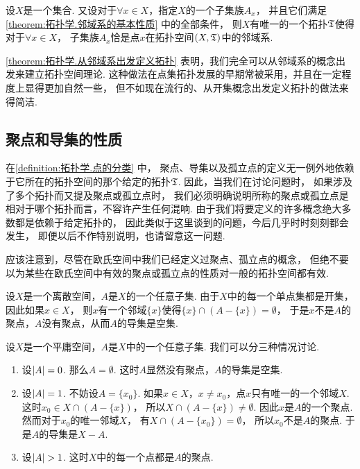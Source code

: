 \begin{theorem}\label{theorem:拓扑学.从邻域系出发定义拓扑}
设\(X\)是一个集合.
又设对于\(\forall x \in X\)，指定\(X\)的一个子集族\(A_x\)，
并且它们满足\cref{theorem:拓扑学.邻域系的基本性质} 中的全部条件，
则\(X\)有唯一的一个拓扑\(\mathfrak T\)使得对于\(\forall x \in X\)，
子集族\(A_x\)恰是点\(x\)在拓扑空间\((X,\mathfrak T)\)中的邻域系.
\end{theorem}

\cref{theorem:拓扑学.从邻域系出发定义拓扑}
表明，我们完全可以从邻域系的概念出发来建立拓扑空间理论.
这种做法在点集拓扑发展的早期常被采用，并且在一定程度上显得更加自然一些，
但不如现在流行的、从开集概念出发定义拓扑的做法来得简洁.

\subsection{聚点和导集的性质}
在\cref{definition:拓扑学.点的分类} 中，
聚点、导集以及孤立点的定义无一例外地依赖于它所在的拓扑空间的那个给定的拓扑\(\mathfrak T\).
因此，当我们在讨论问题时，
如果涉及了多个拓扑而又提及聚点或孤立点时，
我们必须明确说明所称的聚点或孤立点是相对于哪个拓扑而言，不容许产生任何混响.
由于我们将要定义的许多概念绝大多数都是依赖于给定拓扑的，
因此类似于这里谈到的问题，今后几乎时时刻刻都会发生，
即便以后不作特别说明，也请留意这一问题.

应该注意到，尽管在欧氏空间中我们已经定义过聚点、孤立点的概念，
但绝不要以为某些在欧氏空间中有效的聚点或孤立点的性质对一般的拓扑空间都有效.

\begin{example}[离散空间中的聚点]\label{example:拓扑学.离散空间中的聚点}
设\(X\)是一个离散空间，\(A\)是\(X\)的一个任意子集.
由于\(X\)中的每一个单点集都是开集，因此如果\(x \in X\)，
则\(x\)有一个邻域\(\{x\}\)使得\(\{x\}\cap(A-\{x\})=\emptyset\)，
于是\(x\)不是\(A\)的聚点，\(A\)没有聚点，从而\(A\)的导集是空集.
\end{example}

\begin{example}[平庸空间中的聚点]\label{example:拓扑学.平庸空间中的聚点}
设\(X\)是一个平庸空间，\(A\)是\(X\)中的一个任意子集.
我们可以分三种情况讨论.
\begin{enumerate}
	\item 设\(\abs{A} = 0\).
	那么\(A = \emptyset\).
	这时\(A\)显然没有聚点，\(A\)的导集是空集.

	\item 设\(\abs{A} = 1\).
	不妨设\(A = \{x_0\}\).
	如果\(x \in X\)，\(x \neq x_0\)，点\(x\)只有唯一的一个邻域\(X\).
	这时\(x_0 \in X \cap (A - \{x\})\)，
	所以\(X \cap (A - \{x\}) \neq \emptyset\).
	因此\(x\)是\(A\)的一个聚点.
	然而对于\(x_0\)的唯一邻域\(X\)，
	有\(X \cap (A - \{x_0\}) = \emptyset\)，
	所以\(x_0\)不是\(A\)的聚点.
	于是\(A\)的导集是\(X - A\).

	\item 设\(\abs{A} > 1\).
	这时\(X\)中的每一个点都是\(A\)的聚点.
\end{enumerate}
\end{example}

